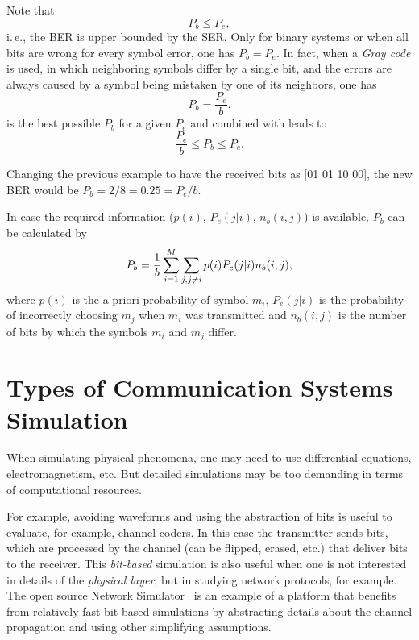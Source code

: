 Note that
\begin{equation}
P_b \le P_e,
\label{eq:pbBound}
\end{equation}
i.\,e., the BER is upper bounded by the SER. Only for binary systems or when all bits are wrong for every symbol error, one has $P_b = P_e$. In fact, when a \emph{Gray code} is used, in which neighboring symbols differ by a single bit, and the errors are always caused by a symbol being mistaken by one of its neighbors, one has
\begin{equation}
P_b = \frac{P_e}{b}.
\label{eq:gray_error_prob}
\end{equation}
 is the best possible $P_b$ for a given $P_e$ and combined with  leads to
\begin{equation}
\frac{P_e}{b} \le P_b \le P_e.
\label{eq:pbTwoBounds}
\end{equation}

Changing the previous example to have the received bits as [01 01 10 00], the new BER would be $P_b=2/8=0.25=P_e/b$.

In case the required information ($p(i)$, $P_e(j|i)$, $n_b(i,j)$) is available, $P_b$ can be calculated by
\[
P_b = \frac{1}{b} \sum_{\vphantom{j}i=1}^M \sum_{j, j \ne i} p(i) P_e(j|i) n_b(i,j),
\]
where $p(i)$ is the a priori probability of symbol $m_i$, $P_e(j|i)$ is the probability of incorrectly choosing $m_j$ when $m_i$ was transmitted and $n_b(i,j)$ is the number of bits by which the symbols $m_i$ and $m_j$ differ.


\section{Types of Communication Systems Simulation}

When simulating physical phenomena, one may need to use differential equations, electromagnetism, etc. But detailed simulations may be too demanding in terms of computational resources. 

For example, avoiding waveforms and using the abstraction of bits is useful to evaluate, for example, channel coders. In this case the transmitter sends bits, which are processed by the channel (can be flipped, erased, etc.) that deliver bits to the receiver. This \emph{bit-based} simulation is also useful when one is not interested in details of the \emph{physical layer}, but in studying network protocols, for example. The open source Network Simulator~ is an example of a platform that benefits from relatively fast bit-based simulations by abstracting details about the channel propagation and using other simplifying assumptions.

